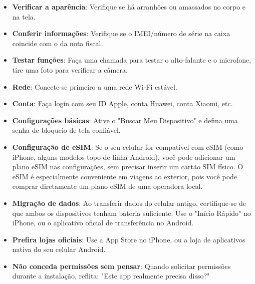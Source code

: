 

\begin{itemize}
  \item \textbf{Verificar a aparência}: Verifique se há arranhões ou amassados no corpo e na tela.
  \item \textbf{Conferir informações}: Verifique se o IMEI/número de série na caixa coincide com o da nota fiscal.
  \item \textbf{Testar funções}: Faça uma chamada para testar o alto-falante e o microfone, tire uma foto para verificar a câmera.
\end{itemize}


\begin{itemize}
  \item \textbf{Rede}: Conecte-se primeiro a uma rede Wi-Fi estável.
  \item \textbf{Conta}: Faça login com seu ID Apple, conta Huawei, conta Xiaomi, etc.
  \item \textbf{Configurações básicas}: Ative o "Buscar Meu Dispositivo" e defina uma senha de bloqueio de tela confiável.
  \item \textbf{Configuração de eSIM}: Se o seu celular for compatível com eSIM (como iPhone, alguns modelos topo de linha Android), você pode adicionar um plano eSIM nas configurações, sem precisar inserir um cartão SIM físico. O eSIM é especialmente conveniente em viagens ao exterior, pois você pode comprar diretamente um plano eSIM de uma operadora local.
  \item \textbf{Migração de dados}: Ao transferir dados do celular antigo, certifique-se de que ambos os dispositivos tenham bateria suficiente. Use o "Início Rápido" no iPhone, ou o aplicativo oficial de transferência no Android.
\end{itemize}


\begin{itemize}
  \item \textbf{Prefira lojas oficiais}: Use a App Store no iPhone, ou a loja de aplicativos nativa do seu celular Android.
  \item \textbf{Não conceda permissões sem pensar}: Quando solicitar permissões durante a instalação, reflita: "Este app realmente precisa disso?"
\end{itemize}
